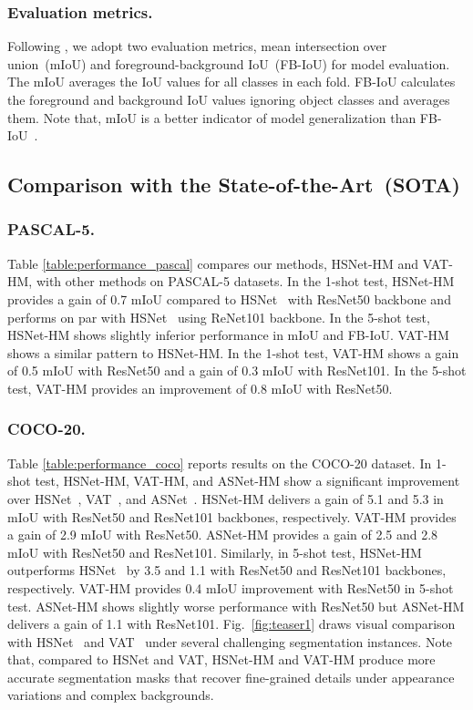 \documentclass[runningheads]{llncs}
\begin{document}
\subsubsection{Evaluation metrics.}
Following \cite{HSNet,PFENet,DAN,VAT}, we adopt two evaluation metrics, mean intersection over union~(mIoU) and foreground-background IoU~(FB-IoU) for model evaluation. The mIoU averages the IoU values for all classes in each fold. FB-IoU calculates the foreground and background IoU values ignoring object classes and averages them. Note that, mIoU is a better indicator of model generalization than FB-IoU~\cite{HSNet}.


\subsection{Comparison with the State-of-the-Art~(SOTA)}


\subsubsection{PASCAL-5.} Table \ref{table:performance_pascal} compares our methods, HSNet-HM and VAT-HM, with other methods on PASCAL-5 datasets. In the 1-shot test, HSNet-HM provides a gain of 0.7 mIoU compared to HSNet~\cite{HSNet} with ResNet50 backbone and performs on par with HSNet~\cite{HSNet} using ReNet101 backbone. In the 5-shot test, HSNet-HM shows slightly inferior performance in mIoU and FB-IoU. VAT-HM shows a similar pattern to HSNet-HM. In the 1-shot test, VAT-HM shows a gain of 0.5 mIoU with ResNet50 and a gain of 0.3 mIoU with ResNet101. In the 5-shot test, VAT-HM provides an improvement of 0.8 mIoU with ResNet50.





\subsubsection{COCO-20.}
Table \ref{table:performance_coco} reports results on the COCO-20 dataset. In 1-shot test, HSNet-HM, VAT-HM, and ASNet-HM show a significant improvement over HSNet~\cite{HSNet}, VAT~\cite{VAT}, and ASNet~\cite{ASNet}. HSNet-HM delivers a gain of 5.1 and 5.3 in mIoU with ResNet50 and ResNet101 backbones, respectively. VAT-HM provides a gain of 2.9 mIoU with ResNet50. ASNet-HM provides a gain of 2.5 and 2.8 mIoU with ResNet50 and ResNet101. Similarly, in 5-shot test, HSNet-HM outperforms HSNet~\cite{HSNet} by 3.5 and 1.1 with ResNet50 and ResNet101 backbones, respectively. VAT-HM provides 0.4 mIoU improvement with ResNet50 in 5-shot test. ASNet-HM shows slightly worse performance with ResNet50 but ASNet-HM delivers a gain of 1.1 with ResNet101. Fig.~\ref{fig:teaser1} draws visual comparison with HSNet~\cite{HSNet} and VAT~\cite{VAT} under several challenging segmentation instances. Note that, compared to HSNet and VAT, HSNet-HM and VAT-HM produce more accurate segmentation masks that recover fine-grained details under appearance variations and complex backgrounds.
\end{document}
